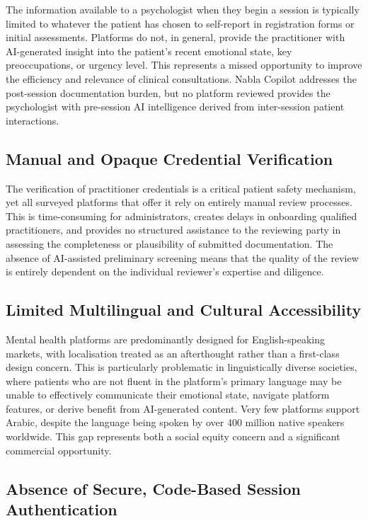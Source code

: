 The information available to a psychologist when they begin a session is
typically limited to whatever the patient has chosen to self-report in
registration forms or initial assessments. Platforms do not, in general, provide
the practitioner with AI-generated insight into the patient's recent emotional
state, key preoccupations, or urgency level. This represents a missed opportunity
to improve the efficiency and relevance of clinical consultations. Nabla Copilot
addresses the post-session documentation burden, but no platform reviewed
provides the psychologist with pre-session AI intelligence derived from
inter-session patient interactions.

\subsection{Manual and Opaque Credential Verification}

The verification of practitioner credentials is a critical patient safety
mechanism, yet all surveyed platforms that offer it rely on entirely manual
review processes. This is time-consuming for administrators, creates delays in
onboarding qualified practitioners, and provides no structured assistance to the
reviewing party in assessing the completeness or plausibility of submitted
documentation. The absence of AI-assisted preliminary screening means that the
quality of the review is entirely dependent on the individual reviewer's
expertise and diligence.

\subsection{Limited Multilingual and Cultural Accessibility}

Mental health platforms are predominantly designed for English-speaking markets,
with localisation treated as an afterthought rather than a first-class design
concern. This is particularly problematic in linguistically diverse societies,
where patients who are not fluent in the platform's primary language may be
unable to effectively communicate their emotional state, navigate platform
features, or derive benefit from AI-generated content. Very few platforms support
Arabic, despite the language being spoken by over 400 million native speakers
worldwide. This gap represents both a social equity concern and a significant
commercial opportunity.

\subsection{Absence of Secure, Code-Based Session Authentication}

